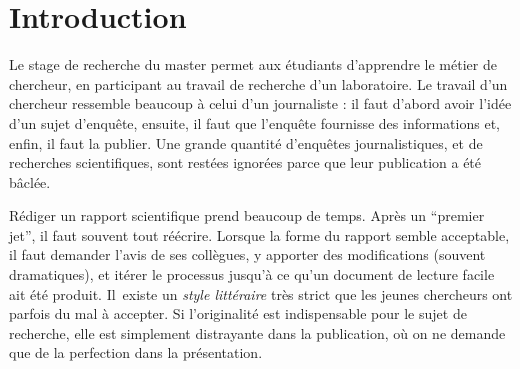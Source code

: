 \documentclass{ipgpmaster}
\begin{document}
\checkyears

\vspace*{5mm}




\def\author{Albert Tarantola}
\def\title{Le Rapport de Stage de Master}
\def\shorttitle{Rapport de stage}
\def\unit{IPGP}
\def\team{Géomagnétisme \& Sismologie}
\def\spe{Géophysique ou autre} %
\def\supervisor{A. Fournier \& G. Moguilny}
\def\mydate{\today}
\def\keywords{Sciences de la Terre,  master, rapport, conseils}

\Entete


\begin{abstract}
Le stage de recherche du master est essentiel dans la formation d'un scientifique, 
car il permet un premier contact avec le monde de la recherche. 
La rédaction du rapport est une composante importante du stage.
Il doit être rédigé en suivant le style littéraire habituel des articles 
scientifiques, avec ses usages bien codifiés. 
Les différentes parties du rapport : 
\emph{Résumé, Introduction, Résultats, Discussion, Conclusion, Remerciements, 
Références bibliographiques,\/} et \emph{Annexes,\/} 
ont chacune des objectifs bien dé\-ter\-mi\-nés. 
On doit chercher la perfection dans la forme.
\end{abstract}

\newpage
\tableofcontents
\newpage

\section{Introduction}

Le stage de recherche du master permet aux étudiants d'apprendre le métier 
de chercheur, en participant au travail de recherche d'un laboratoire. 
Le travail d'un chercheur ressemble beaucoup à celui d'un journaliste : 
il faut d'abord avoir l'idée d'un sujet d'enquête, ensuite, il faut que 
l'enquête fournisse des informations et, enfin, il faut la publier. 
Une grande quantité d'enquêtes journalistiques, et de recherches 
scientifiques, sont restées ignorées parce que leur publication a été 
bâclée.

Rédiger un rapport scientifique prend beaucoup de temps. Après un 
``premier jet'', il faut souvent tout réécrire. 
Lorsque la forme du rapport semble acceptable, il faut demander l'avis 
de ses collègues, y apporter des modifications (souvent dramatiques), 
et itérer le processus
jusqu'à ce qu'un document de lecture facile ait été produit. Il~existe 
un \emph{style littéraire\/} très strict que les jeunes chercheurs ont parfois 
du mal à accepter. Si l'originalité est indispensable pour le sujet de 
recherche, elle est simplement distrayante dans la publication,
où on ne demande que de la perfection dans la pré\-sen\-ta\-tion.
\end{document}
